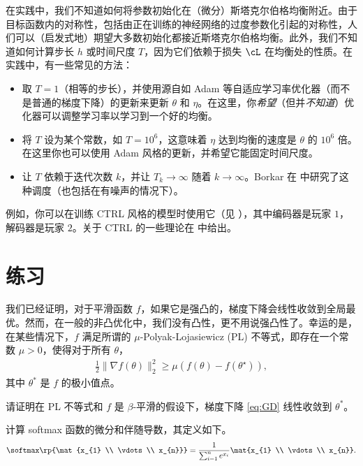 \documentclass[../../book-main_zh.tex]{subfiles}
\begin{document}
在实践中，我们不知道如何将参数初始化在（微分）斯塔克尔伯格均衡附近。由于目标函数内的对称性，包括由正在训练的神经网络的过度参数化引起的对称性，人们可以（启发式地）期望大多数初始化都接近斯塔克尔伯格均衡。此外，我们不知道如何计算步长 \(h\) 或时间尺度 \(T\)，因为它们依赖于损失 \(\cL\) 在均衡处的性质。在实践中，有一些常见的方法：
\begin{itemize}
    \item 取 \(T = 1\)（相等的步长），并使用源自如 Adam 等自适应学习率优化器（而不是普通的梯度下降）的更新来更新 \(\theta\) 和 \(\eta\)。在这里，你\textit{希望}（但并\textit{不知道}）优化器可以调整学习率以学习到一个好的均衡。
    \item 将 \(T\) 设为某个常数，如 \(T = 10^{6}\)，这意味着 \(\eta\) 达到均衡的速度是 \(\theta\) 的 \(10^{6}\) 倍。在这里你也可以使用 Adam 风格的更新，并希望它能固定时间尺度。
    \item 让 \(T\) 依赖于迭代次数 \(k\)，并让 \(T_{k}
        \to \infty\) 随着 \(k \to \infty\)。Borkar 在 \cite{borkar1997stochastic} 中研究了这种调度（也包括在有噪声的情况下）。
\end{itemize}
例如，你可以在训练 CTRL 风格的模型时使用它（见 ），其中编码器是玩家 \(1\)，解码器是玩家 \(2\)。关于 CTRL 的一些理论在  中给出。

\section{练习}

\begin{exercise}
    我们已经证明，对于平滑函数 $f$，如果它是强凸的，梯度下降会线性收敛到全局最优。然而，在一般的非凸优化中，我们没有凸性，更不用说强凸性了。幸运的是，在某些情况下，$f$ 满足所谓的 $\mu$-Polyak-Lojasiewicz (PL) 不等式，即存在一个常数 $\mu > 0$，使得对于所有 $\theta$，
    \begin{align*}
        \frac{1}{2}\|\nabla f(\theta)\|_2^2 \ge \mu\left( f(\theta) -
        f(\theta^\star) \right),
    \end{align*}
    其中 $\theta^*$ 是 $f$ 的极小值点。

    请证明在 PL 不等式和 $f$ 是 $\beta$-平滑的假设下，梯度下降 \eqref{eq:GD} 线性收敛到 $\theta^*$。
\end{exercise}

\begin{exercise}
    计算 softmax 函数的微分和伴随导数，其定义如下。
    \begin{equation}
        \softmax\rp{\mat{x_{1} \\ \vdots \\ x_{n}}} =
        \frac{1}{\sum_{i = 1}^{n}e^{x_{i}}}\mat{x_{1} \\ \vdots \\ x_{n}}.
    \end{equation}
\end{exercise}
\end{document}
